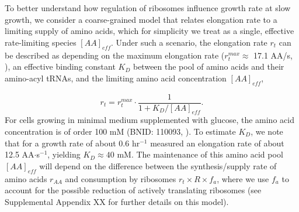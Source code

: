 


To better understand how regulation of ribosomes influence growth rate at
slow growth, we consider a coarse-grained model that relates elongation
rate to a limiting supply of amino acids, which for simplicity we treat as a
single, effective rate-limiting species $[AA]_{eff}$. Under such a scenario, the elongation
rate $r_t$ can be described as depending on the maximum elongation rate ($r_t^{max}
\approx$ 17.1 AA/s, \citep{dai2016, dai2018}), an effective binding constant
$K_D$ between the pool of amino acids and their amino-acyl tRNAs, and the limiting
amino acid concentration $[AA]_{eff}$,

\begin{equation}
r_t = r_t^{max} \cdot \frac{1}{1 + K_D / [AA]_{eff}}.
\label{eq:rate_Kd}
\end{equation}
For cells growing in minimal medium supplemented with glucose, the amino acid
concentration is of order 100 mM (BNID: 110093, \citep{milo2010, bennett2009}).
To estimate  $K_D$, we note that for a growth rate of about 0.6 hr$^{-1}$
\cite{dai2016} measured an elongation rate of about 12.5 AA$\cdot$s$^{-1}$,
yielding $K_D \approx 40$ mM. The maintenance of this amino acid pool
$[AA]_{eff}$ will depend on the difference between the synthesis/supply rate of
amino acids $r_{AA}$ and consumption by ribosomes $r_t \times R \times f_a$,
where we use $f_a$ to account for the possible reduction of actively translating
ribosomes (see Supplemental Appendix XX for further details on this model).

